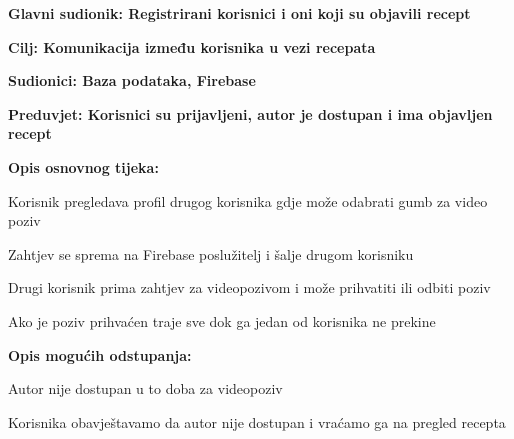 				\noindent {}
				\begin{packed_item}
					
					\item \textbf{Glavni sudionik: Registrirani korisnici i oni koji su objavili recept }
					\item  \textbf{Cilj: Komunikacija između korisnika u vezi recepata} 
					\item  \textbf{Sudionici: Baza podataka, Firebase} 
					\item  \textbf{Preduvjet: Korisnici su prijavljeni, autor je dostupan i ima objavljen recept} 
					\item  \textbf{Opis osnovnog tijeka:}
					
					\item[] \begin{packed_enum}
						
						\item Korisnik pregledava profil drugog korisnika gdje može odabrati gumb za video poziv
						\item Zahtjev se sprema na Firebase poslužitelj i šalje drugom korisniku
						\item Drugi korisnik prima zahtjev za videopozivom i može prihvatiti ili odbiti poziv
						\item Ako je poziv prihvaćen traje sve dok ga jedan od korisnika ne prekine
					\end{packed_enum}
					
					\item  \textbf{Opis mogućih odstupanja:}
					
					\item[] \begin{packed_item}
						
						\item[2.a] Autor nije dostupan u to doba za videopoziv
						\item[] \begin{packed_enum}
							
							\item Korisnika obavještavamo da autor nije dostupan i vraćamo ga na pregled recepta
							
						\end{packed_enum}
						
					\end{packed_item}
				\end{packed_item}
				
				
				
